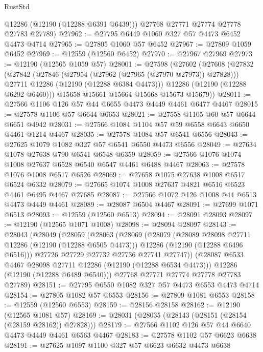 \begin{lexlean}{RustStd}
\begin{coremodule}
        @12286
        (@12190 (@12288 @6391 @6439)))
      @27768
      @27771
      @27774
      @27778
      @27783
      @27789)
@27962 := @27795 @6449 @1060 @327 @57 @4473 @6452 @4473 @4714
@27965 := @27805 @1060 @57 @6452
@27967 := @27809 @1059 @6452
@27969 := @12559 (@12560 @6452)
@27970 := @27967 @27969
@27973 := @12190 (@12565 @1059 @57)
@28001 := @27598
    (@27602
      (@27608
        (@27832
          (@27842
            (@27846 (@27954 (@27962 (@27965 (@27970 @27973)) @27828)))
            @27711
            @12286
            (@12190 (@12288 @6384 @4473)))
          @12286
          (@12190 (@12288 @6292 @6460)))
        @15658
        @15661
        @15664
        @15668
        @15673
        @15679))
@28011 := @27566 @1106 @126 @57 @44 @6655 @4473 @4449 @4461 @6477 @4467
@28015 := @27578 @1106 @57 @6644 @6653
@28021 := @27558 @1105 @60 @57 @6644 @6651 @4942
@28031 := @27566 @1084 @1104 @57 @59 @6558 @6643 @6650 @4461 @1214 @4467
@28035 := @27578 @1084 @57 @6541 @6556
@28043 := @27625 @1079 @1082 @327 @57 @6541 @6550 @4473 @6556
@28049 := @27634 @1078 @27638 @790 @6541 @6548 @6359
@28059 := @27566 @1076 @1074 @1008 @27637 @6528 @6540 @6547 @4461 @6488 @4467
@28063 := @27578 @1076 @1008 @6517 @6526
@28069 := @27658 @1075 @27638 @1008 @6517 @6524 @6332
@28079 := @27665 @1074 @1008 @27637 @4821 @6516 @6523 @4461 @6495 @4467 @27685
@28087 := @27566 @1072 @126 @1008 @44 @6513 @4473 @4449 @4461
@28089 := @28087 @6504 @4467
@28091 := @27699 @1071 @6513
@28093 := @12559 (@12560 @6513)
@28094 := @28091 @28093
@28097 := @12190 (@12565 @1071 @1008)
@28098 := @28094 @28097
@28143 := @28043
    (@28049
      (@28059
        (@28063
          (@28069
            (@28079
              (@28089 @28098 @27711 @12286 (@12190 (@12288 @6505 @4473)))
              @12286
              (@12190 (@12288 @6496 @6516)))
            @27726
            @27729
            @27732
            @27736
            @27741
            @27747))
        (@28087 @6533 @4467 @28098 @27711 @12286 (@12190 (@12288 @6534 @4473)))
        @12286
        (@12190 (@12288 @6489 @6540)))
      @27768
      @27771
      @27774
      @27778
      @27783
      @27789)
@28151 := @27795 @6550 @1082 @327 @57 @4473 @6553 @4473 @4714
@28154 := @27805 @1082 @57 @6553
@28156 := @27809 @1081 @6553
@28158 := @12559 (@12560 @6553)
@28159 := @28156 @28158
@28162 := @12190 (@12565 @1081 @57)
@28169 := @28031 (@28035 (@28143 (@28151 (@28154 (@28159 @28162)) @27828)))
@28179 := @27566 @1102 @126 @57 @44 @6640 @4473 @4449 @4461 @6563 @4467
@28183 := @27578 @1102 @57 @6623 @6638
@28191 := @27625 @1097 @1100 @327 @57 @6623 @6632 @4473 @6638

\end{coremodule}
\end{lexlean}
